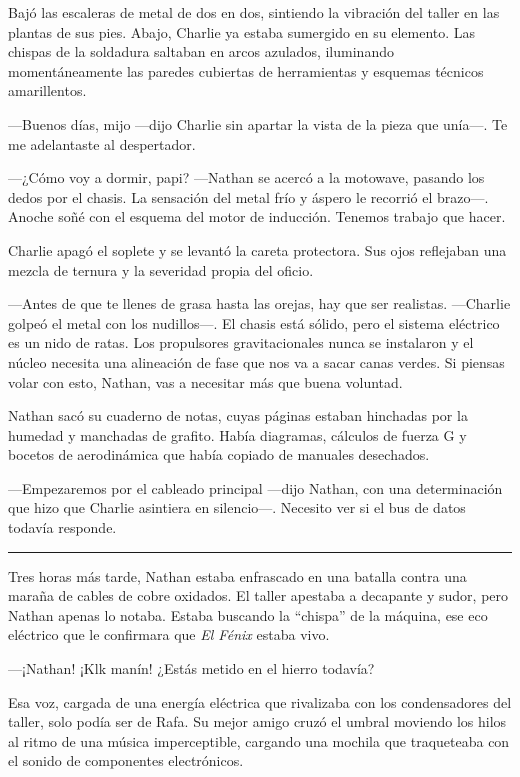 \documentclass[12pt,a4paper]{book}
\begin{document}
Bajó las escaleras de metal de dos en dos, sintiendo la vibración del taller en las plantas de sus pies. Abajo, Charlie ya estaba sumergido en su elemento. Las chispas de la soldadura saltaban en arcos azulados, iluminando momentáneamente las paredes cubiertas de herramientas y esquemas técnicos amarillentos.

---Buenos días, mijo ---dijo Charlie sin apartar la vista de la pieza que unía---. Te me adelantaste al despertador.

---¿Cómo voy a dormir, papi? ---Nathan se acercó a la motowave, pasando los dedos por el chasis. La sensación del metal frío y áspero le recorrió el brazo---. Anoche soñé con el esquema del motor de inducción. Tenemos trabajo que hacer.

Charlie apagó el soplete y se levantó la careta protectora. Sus ojos reflejaban una mezcla de ternura y la severidad propia del oficio.

---Antes de que te llenes de grasa hasta las orejas, hay que ser realistas. ---Charlie golpeó el metal con los nudillos---. El chasis está sólido, pero el sistema eléctrico es un nido de ratas. Los propulsores gravitacionales nunca se instalaron y el núcleo necesita una alineación de fase que nos va a sacar canas verdes. Si piensas volar con esto, Nathan, vas a necesitar más que buena voluntad.

Nathan sacó su cuaderno de notas, cuyas páginas estaban hinchadas por la humedad y manchadas de grafito. Había diagramas, cálculos de fuerza G y bocetos de aerodinámica que había copiado de manuales desechados.

---Empezaremos por el cableado principal ---dijo Nathan, con una determinación que hizo que Charlie asintiera en silencio---. Necesito ver si el bus de datos todavía responde.

\bigskip
\noindent\rule{\textwidth}{0.4pt}
\bigskip

Tres horas más tarde, Nathan estaba enfrascado en una batalla contra una maraña de cables de cobre oxidados. El taller apestaba a decapante y sudor, pero Nathan apenas lo notaba. Estaba buscando la ``chispa'' de la máquina, ese eco eléctrico que le confirmara que \textit{El Fénix} estaba vivo.

---¡Nathan! ¡Klk manín! ¿Estás metido en el hierro todavía?

Esa voz, cargada de una energía eléctrica que rivalizaba con los condensadores del taller, solo podía ser de Rafa. Su mejor amigo cruzó el umbral moviendo los hilos al ritmo de una música imperceptible, cargando una mochila que traqueteaba con el sonido de componentes electrónicos.
\end{document}
